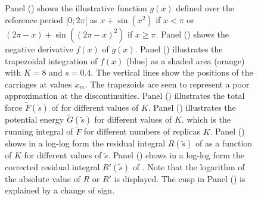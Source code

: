 \begin{figure}[H]
  \centering
  \\
  \vspace{-1em}%
  \\
  \vspace{-1em}%
  \\
  \vspace{-1em}%
  \\
  \caption{\footnotesize{}
    Panel () shows the illustrative function $g(x)$ defined 
    over the reference period $[0;2\pi[$ as 
        $x+\sin (x^2)$ if  $x<\pi$ or 
        $(2\pi-x)+\sin ((2\pi-x)^2)$ if $x\geq\pi$.
    Panel () shows the negative derivative $f(x)$ of $g(x)$.
    Panel () illustrates the trapezoidal integration of $f(x)$ (blue)
    as a shaded area (orange) with $K=8$ and $s=0.4$. The vertical lines show the positions of the
    carriages at values $x_m$. The trapezoids are seen to represent a poor approximation
    at the discontinuities.
    Panel () illustrates the total force $\tilde{F}(\tilde{s})$ 
    of  for different values of $K$.
    Panel () illustrates the potential energy $\tilde{G}(\tilde{s})$
    for different values of $K$.    which is the running integral of $\tilde{F}$ for different numbers of replicas $K$.
    Panel () shows in a log-log form the residual integral 
    $R(\tilde{s})$ of  
    as a function of $K$ for different values of $\tilde{s}$. 
    Panel () shows in a log-log form the corrected residual integral  $R'(\tilde{s})$ of . Note that the logarithm of the absolute value of $R$ or $R'$ is displayed. The cusp in Panel () is explained by a change of sign.
  }
  \label{fig:app}
\end{figure}

